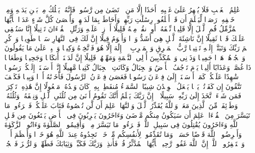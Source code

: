 \stopbuffer%
\startbuffer[\q:72:26]
عَٰلِمُ ٱلۡغَیۡبِ فَلَا یُظۡهِرُ عَلَىٰ غَیۡبِهِۦۤ أَحَدًا%
\stopbuffer%
\startbuffer[\q:72:27]
إِلَّا مَنِ ٱرۡتَضَىٰ مِن رَّسُولࣲ فَإِنَّهُۥ یَسۡلُكُ مِنۢ بَیۡنِ یَدَیۡهِ وَمِنۡ خَلۡفِهِۦ رَصَدࣰا%
\stopbuffer%
\startbuffer[\q:72:28]
لِّیَعۡلَمَ أَن قَدۡ أَبۡلَغُوا۟ رِسَٰلَٰتِ رَبِّهِمۡ وَأَحَاطَ بِمَا لَدَیۡهِمۡ وَأَحۡصَىٰ كُلَّ شَیۡءٍ عَدَدَۢا%
\stopbuffer%
\startbuffer[\q:73:1]
یَٰۤأَیُّهَا ٱلۡمُزَّمِّلُ%
\stopbuffer%
\startbuffer[\q:73:2]
قُمِ ٱلَّیۡلَ إِلَّا قَلِیلࣰا%
\stopbuffer%
\startbuffer[\q:73:3]
نِّصۡفَهُۥۤ أَوِ ٱنقُصۡ مِنۡهُ قَلِیلًا%
\stopbuffer%
\startbuffer[\q:73:4]
أَوۡ زِدۡ عَلَیۡهِ وَرَتِّلِ ٱلۡقُرۡءَانَ تَرۡتِیلًا%
\stopbuffer%
\startbuffer[\q:73:5]
إِنَّا سَنُلۡقِی عَلَیۡكَ قَوۡلࣰا ثَقِیلًا%
\stopbuffer%
\startbuffer[\q:73:6]
إِنَّ نَاشِئَةَ ٱلَّیۡلِ هِیَ أَشَدُّ وَطۡءࣰا وَأَقۡوَمُ قِیلًا%
\stopbuffer%
\startbuffer[\q:73:7]
إِنَّ لَكَ فِی ٱلنَّهَارِ سَبۡحࣰا طَوِیلࣰا%
\stopbuffer%
\startbuffer[\q:73:8]
وَٱذۡكُرِ ٱسۡمَ رَبِّكَ وَتَبَتَّلۡ إِلَیۡهِ تَبۡتِیلࣰا%
\stopbuffer%
\startbuffer[\q:73:9]
رَّبُّ ٱلۡمَشۡرِقِ وَٱلۡمَغۡرِبِ لَاۤ إِلَٰهَ إِلَّا هُوَ فَٱتَّخِذۡهُ وَكِیلࣰا%
\stopbuffer%
\startbuffer[\q:73:10]
وَٱصۡبِرۡ عَلَىٰ مَا یَقُولُونَ وَٱهۡجُرۡهُمۡ هَجۡرࣰا جَمِیلࣰا%
\stopbuffer%
\startbuffer[\q:73:11]
وَذَرۡنِی وَٱلۡمُكَذِّبِینَ أُو۟لِی ٱلنَّعۡمَةِ وَمَهِّلۡهُمۡ قَلِیلًا%
\stopbuffer%
\startbuffer[\q:73:12]
إِنَّ لَدَیۡنَاۤ أَنكَالࣰا وَجَحِیمࣰا%
\stopbuffer%
\startbuffer[\q:73:13]
وَطَعَامࣰا ذَا غُصَّةࣲ وَعَذَابًا أَلِیمࣰا%
\stopbuffer%
\startbuffer[\q:73:14]
یَوۡمَ تَرۡجُفُ ٱلۡأَرۡضُ وَٱلۡجِبَالُ وَكَانَتِ ٱلۡجِبَالُ كَثِیبࣰا مَّهِیلًا%
\stopbuffer%
\startbuffer[\q:73:15]
إِنَّاۤ أَرۡسَلۡنَاۤ إِلَیۡكُمۡ رَسُولࣰا شَٰهِدًا عَلَیۡكُمۡ كَمَاۤ أَرۡسَلۡنَاۤ إِلَىٰ فِرۡعَوۡنَ رَسُولࣰا%
\stopbuffer%
\startbuffer[\q:73:16]
فَعَصَىٰ فِرۡعَوۡنُ ٱلرَّسُولَ فَأَخَذۡنَٰهُ أَخۡذࣰا وَبِیلࣰا%
\stopbuffer%
\startbuffer[\q:73:17]
فَكَیۡفَ تَتَّقُونَ إِن كَفَرۡتُمۡ یَوۡمࣰا یَجۡعَلُ ٱلۡوِلۡدَٰنَ شِیبًا%
\stopbuffer%
\startbuffer[\q:73:18]
ٱلسَّمَاۤءُ مُنفَطِرُۢ بِهِۦۚ كَانَ وَعۡدُهُۥ مَفۡعُولًا%
\stopbuffer%
\startbuffer[\q:73:19]
إِنَّ هَٰذِهِۦ تَذۡكِرَةࣱۖ فَمَن شَاۤءَ ٱتَّخَذَ إِلَىٰ رَبِّهِۦ سَبِیلًا%
\stopbuffer%
\startbuffer[\q:73:20]
۞ إِنَّ رَبَّكَ یَعۡلَمُ أَنَّكَ تَقُومُ أَدۡنَىٰ مِن ثُلُثَیِ ٱلَّیۡلِ وَنِصۡفَهُۥ وَثُلُثَهُۥ وَطَاۤئِفَةࣱ مِّنَ ٱلَّذِینَ مَعَكَۚ وَٱللَّهُ یُقَدِّرُ ٱلَّیۡلَ وَٱلنَّهَارَۚ عَلِمَ أَن لَّن تُحۡصُوهُ فَتَابَ عَلَیۡكُمۡۖ فَٱقۡرَءُوا۟ مَا تَیَسَّرَ مِنَ ٱلۡقُرۡءَانِۚ عَلِمَ أَن سَیَكُونُ مِنكُم مَّرۡضَىٰ وَءَاخَرُونَ یَضۡرِبُونَ فِی ٱلۡأَرۡضِ یَبۡتَغُونَ مِن فَضۡلِ ٱللَّهِ وَءَاخَرُونَ یُقَٰتِلُونَ فِی سَبِیلِ ٱللَّهِۖ فَٱقۡرَءُوا۟ مَا تَیَسَّرَ مِنۡهُۚ وَأَقِیمُوا۟ ٱلصَّلَوٰةَ وَءَاتُوا۟ ٱلزَّكَوٰةَ وَأَقۡرِضُوا۟ ٱللَّهَ قَرۡضًا حَسَنࣰاۚ وَمَا تُقَدِّمُوا۟ لِأَنفُسِكُم مِّنۡ خَیۡرࣲ تَجِدُوهُ عِندَ ٱللَّهِ هُوَ خَیۡرࣰا وَأَعۡظَمَ أَجۡرࣰاۚ وَٱسۡتَغۡفِرُوا۟ ٱللَّهَۖ إِنَّ ٱللَّهَ غَفُورࣱ رَّحِیمُۢ%
\stopbuffer%
\startbuffer[\q:74:1]
یَٰۤأَیُّهَا ٱلۡمُدَّثِّرُ%
\stopbuffer%
\startbuffer[\q:74:2]
قُمۡ فَأَنذِرۡ%
\stopbuffer%
\startbuffer[\q:74:3]
وَرَبَّكَ فَكَبِّرۡ%
\stopbuffer%
\startbuffer[\q:74:4]
وَثِیَابَكَ فَطَهِّرۡ%
\stopbuffer%
\startbuffer[\q:74:5]
وَٱلرُّجۡزَ فَٱهۡجُرۡ%
\stopbuffer%

